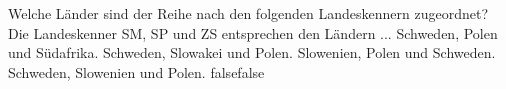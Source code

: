     {Welche Länder sind der Reihe nach den folgenden Landeskennern zugeordnet? Die Landeskenner SM, SP und ZS entsprechen den Ländern ...}
    {Schweden, Polen und Südafrika.}
    {Schweden, Slowakei und Polen.}
    {Slowenien, Polen und Schweden.}
    {Schweden, Slowenien und Polen.}
    {false}{false}